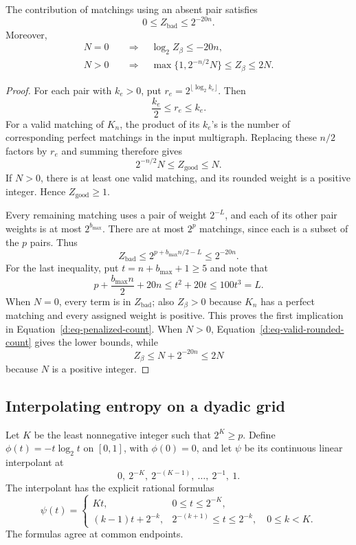 \begin{lemma}
\label{d:lem-penalized-count}
The contribution of matchings using an absent pair satisfies
\[
  0\le Z_{\mathrm{bad}}\le2^{-20n}.
\]
Moreover,
\begin{equation}
\label{d:eq-penalized-count}
\begin{aligned}
 N=0&\quad\Longrightarrow\quad \log_2 Z_\beta\le-20n,\\
 N>0&\quad\Longrightarrow\quad
       \max\{1,2^{-n/2}N\}\le Z_\beta\le2N.
\end{aligned}
\end{equation}
\end{lemma}

\begin{proof}
For each pair with \(k_e>0\), put
\(r_e=2^{\lfloor\log_2 k_e\rfloor}\).  Then
\[
  \frac{k_e}{2}\le r_e\le k_e.
\]
For a valid matching of \(K_n\), the product of its \(k_e\)'s is the
number of corresponding perfect matchings in the input multigraph.
Replacing these \(n/2\) factors by \(r_e\) and summing therefore gives
\begin{equation}
\label{d:eq-valid-rounded-count}
  2^{-n/2}N\le Z_{\mathrm{good}}\le N.
\end{equation}
If \(N>0\), there is at least one valid matching, and its rounded
weight is a positive integer.  Hence \(Z_{\mathrm{good}}\ge1\).

Every remaining matching uses a pair of weight \(2^{-L}\), and each
of its other pair weights is at most \(2^{b_{\max}}\).  There are at most
\(2^p\) matchings, since each is a subset of the \(p\) pairs.  Thus
\[
  Z_{\mathrm{bad}}\le 2^{p+b_{\max}n/2-L}\le2^{-20n}.
\]
For the last inequality, put \(t=n+b_{\max}+1\ge5\) and note that
\[
  p+\frac{b_{\max}n}{2}+20n\le t^2+20t\le100t^3=L.
\]
When \(N=0\), every term is in \(Z_{\mathrm{bad}}\); also \(Z_\beta>0\)
because \(K_n\) has a perfect matching and every assigned weight is
positive.  This proves the first implication in
Equation~\eqref{d:eq-penalized-count}.
When \(N>0\), Equation~\eqref{d:eq-valid-rounded-count} gives the lower
bounds, while
\[
  Z_\beta\le N+2^{-20n}\le2N
\]
because \(N\) is a positive integer.
\end{proof}

\subsection{Interpolating entropy on a dyadic grid}

Let \(K\) be the least nonnegative integer such that \(2^K\ge p\).
Define \(\phi(t)=-t\log_2 t\) on \([0,1]\), with \(\phi(0)=0\), and
let \(\psi\) be its continuous linear interpolant at
\[
  0,\ 2^{-K},\ 2^{-(K-1)},\ \ldots,\ 2^{-1},\ 1.
\]
The interpolant has the explicit rational formulas
\begin{equation}
\label{d:eq-dyadic-chords}
 \psi(t)=
 \begin{cases}
   Kt,&0\le t\le2^{-K},\\
   (k-1)t+2^{-k},
     &2^{-(k+1)}\le t\le2^{-k},\quad 0\le k<K.
 \end{cases}
\end{equation}
The formulas agree at common endpoints.

